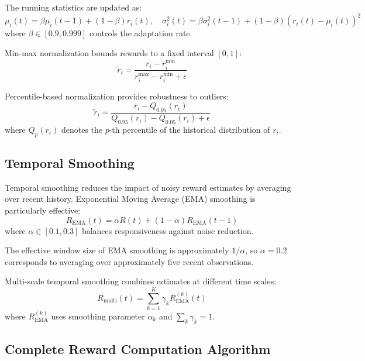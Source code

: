 The running statistics are updated as:
\begin{equation}
\mu_i(t) = \beta \mu_i(t-1) + (1-\beta) r_i(t), \quad \sigma_i^2(t) = \beta \sigma_i^2(t-1) + (1-\beta) (r_i(t) - \mu_i(t))^2
\label{eq:running_statistics}
\end{equation}
where $\beta \in [0.9, 0.999]$ controls the adaptation rate.

Min-max normalization bounds rewards to a fixed interval $[0, 1]$:
\begin{equation}
\tilde{r}_i = \frac{r_i - r_i^{\min}}{r_i^{\max} - r_i^{\min} + \epsilon}
\label{eq:minmax_normalization}
\end{equation}

Percentile-based normalization provides robustness to outliers:
\begin{equation}
\tilde{r}_i = \frac{r_i - Q_{0.05}(r_i)}{Q_{0.95}(r_i) - Q_{0.05}(r_i) + \epsilon}
\label{eq:percentile_normalization}
\end{equation}
where $Q_p(r_i)$ denotes the $p$-th percentile of the historical distribution of $r_i$.

\subsection{Temporal Smoothing}

Temporal smoothing reduces the impact of noisy reward estimates by averaging over recent history. Exponential Moving Average (EMA) smoothing is particularly effective:
\begin{equation}
R_{\text{EMA}}(t) = \alpha R(t) + (1 - \alpha) R_{\text{EMA}}(t-1)
\label{eq:ema_smoothing}
\end{equation}
where $\alpha \in [0.1, 0.3]$ balances responsiveness against noise reduction.

The effective window size of EMA smoothing is approximately $1/\alpha$, so $\alpha = 0.2$ corresponds to averaging over approximately five recent observations.

Multi-scale temporal smoothing combines estimates at different time scales:
\begin{equation}
R_{\text{multi}}(t) = \sum_{k=1}^{K} \gamma_k R_{\text{EMA}}^{(k)}(t)
\label{eq:multiscale_smoothing}
\end{equation}
where $R_{\text{EMA}}^{(k)}$ uses smoothing parameter $\alpha_k$ and $\sum_k \gamma_k = 1$.

\subsection{Complete Reward Computation Algorithm}

